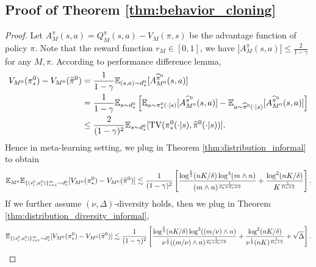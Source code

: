 \documentclass[11pt]{article}
\numberwithin{equation}{section}
\begin{document}
\subsection{Proof of Theorem \ref{thm:behavior_cloning}}\label{app:subsec:proof_bc}

\begin{proof}
    Let $A_M^\pi(s,a)=Q_M^\pi(s,a)-V_M(\pi,s)$ be the advantage function of policy $\pi$.
    Note that the reward function $r_M\in[0,1]$, we have $|A_M^\pi(s,a)|\leq \frac{2}{1-\gamma}$ for any $M,\pi$.
    According to performance difference lemma,
    \begin{equation}
        \begin{aligned}
             V_{M^0}(\pi_*^0)-V_{M^0}(\widehat{\pi}^0) 
             &= \frac{1}{1-\gamma}\mathbb{E}_{(s,a)\sim d_*^0} [A_{M^0}^{\widehat{\pi}^0}(s,a)] \\
             &= \frac{1}{1-\gamma}\mathbb{E}_{s\sim d_*^0} \left[\mathbb{E}_{a\sim \pi_*^0(\cdot|s)}[A_{M^0}^{\widehat{\pi}^0}(s,a)]-\mathbb{E}_{a\sim \widehat{\pi}^0(\cdot|s)}[A_{M^0}^{\widehat{\pi}^0}(s,a)]\right] \\
             &\leq \frac{2}{(1-\gamma)^2}\mathbb{E}_{s\sim d_*^0}[\mathrm{TV}(\pi_*^0(\cdot|s),\widehat{\pi}^0(\cdot|s))].
        \end{aligned}
    \end{equation}
    Hence in meta-learning setting, we plug in Theorem \ref{thm:distribution_informal} to obtain
    \begin{equation}
        \mathbb{E}_{M^0}\mathbb{E}_{\{(s_i^0,a_i^0)\}_{i=1}^m\sim d_*^0}[V_{M^0}(\pi_*^0)-V_{M^0}(\widehat{\pi}^0)]\lesssim \frac{1}{(1-\gamma)^2}\left[\frac{\log^{\frac{5}{2}}(nK/\delta)\log^3(m\wedge n)}{(m\wedge n)^{\frac{1}{d_a+d_s+9}}}+\frac{\log^2(nK/\delta)}{K^{\frac{1}{D_s+2}}}\right].
    \end{equation}
    If we further assume $(\nu,\Delta)$-diversity holds, then we plug in Theorem \ref{thm:distribution_diversity_informal},
    \begin{equation}
        \mathbb{E}_{\{(s_i^0,a_i^0)\}_{i=1}^m\sim d_*^0}[V_{M^0}(\pi_*^0)-V_{M^0}(\widehat{\pi}^0)]\lesssim \frac{1}{(1-\gamma)^2}\left[\frac{\log^{\frac{5}{2}}(nK/\delta)\log^3((m/\nu)\wedge n)}{\nu^{\frac{1}{2}}((m/\nu)\wedge n)^{\frac{1}{d_a+d_s+9}}}+\frac{\log^2(nK/\delta)}{\nu^{\frac{1}{2}}(nK)^{\frac{1}{D_s+2}}}+\sqrt{\Delta}\right].
    \end{equation}
    
\end{proof}
\end{document}
